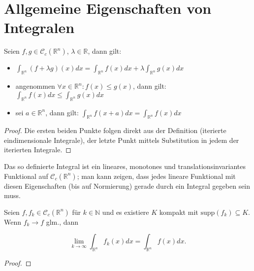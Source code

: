 \section{Allgemeine Eigenschaften von Integralen}
\begin{theorem}
	Seien $f,g\in \mathcal C_c(\mathbb R^n)$, $\lambda\in \mathbb R$, dann gilt:
	
	\begin{itemize}
		\item $\int_{\mathbb R^n}(f+\lambda g)(x)dx=\int_{\mathbb R^n} f(x)dx + \lambda\int_{\mathbb R^n} g(x)dx$
		\item angenommen $\forall x\in\mathbb R^n: f(x)\leq g(x)$, dann gilt: $\int_{\mathbb R^n} f(x)dx \leq \int_{\mathbb R^n} g(x)dx$
		\item sei $a\in\mathbb R^n$, dann gilt: $\int_{\mathbb R^n} f(x+a)dx = \int_{\mathbb R^n} f(x)dx$
	\end{itemize}
\end{theorem}
\begin{proof}
	Die ersten beiden Punkte folgen direkt aus der Definition (iterierte eindimensionale Integrale), der letzte Punkt mittels Substitution in jedem der iterierten Integrale.
\end{proof}
\begin{remark}
	Das so definierte Integral ist ein lineares, monotones und translationsinvariantes Funktional auf $\mathcal C_c(\mathbb R^n)$; man kann zeigen, dass jedes lineare Funktional mit diesen Eigenschaften (bis auf Normierung) gerade durch ein Integral gegeben sein muss.
\end{remark}

\begin{theorem}
	Seien $f,f_k\in\mathcal C_c(\mathbb R^n)$ f\"ur $k\in\mathbb N$ und es existiere $K$ kompakt mit $\text{supp}(f_k)\subseteq K$. Wenn $f_k \rightarrow f$ glm., dann 
	
	$$\lim_{k\rightarrow\infty}\int_{\mathbb R^n}f_k(x)dx = \int_{\mathbb R^n} f(x)dx.$$
\end{theorem}
\begin{proof}
\end{proof}





